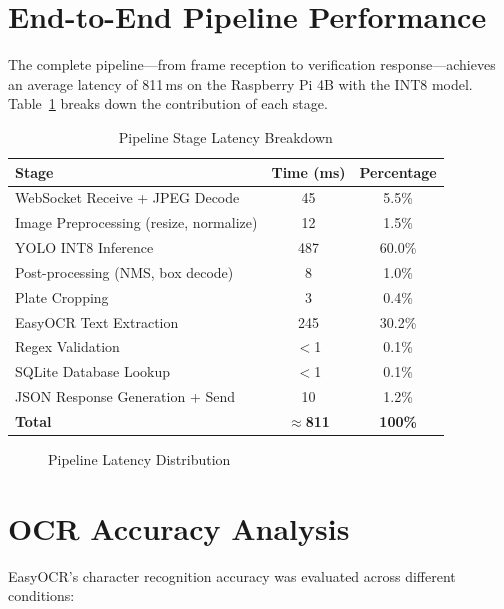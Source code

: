 \documentclass[11pt]{report}
\begin{document}
\section{End-to-End Pipeline Performance}
The complete pipeline---from frame reception to verification response---achieves an average latency of 811\,ms on the Raspberry Pi 4B with the INT8 model. Table~\ref{tab:pipeline_breakdown} breaks down the contribution of each stage.

\begin{table}[H]
\centering
\caption{Pipeline Stage Latency Breakdown}
\label{tab:pipeline_breakdown}
\renewcommand{\arraystretch}{1.3}
\begin{tabular}{|l|c|c|}
\hline
\textbf{Stage} & \textbf{Time (ms)} & \textbf{Percentage} \\
\hline
WebSocket Receive + JPEG Decode & 45 & 5.5\% \\
\hline
Image Preprocessing (resize, normalize) & 12 & 1.5\% \\
\hline
YOLO INT8 Inference & 487 & 60.0\% \\
\hline
Post-processing (NMS, box decode) & 8 & 1.0\% \\
\hline
Plate Cropping & 3 & 0.4\% \\
\hline
EasyOCR Text Extraction & 245 & 30.2\% \\
\hline
Regex Validation & $<$1 & 0.1\% \\
\hline
SQLite Database Lookup & $<$1 & 0.1\% \\
\hline
JSON Response Generation + Send & 10 & 1.2\% \\
\hline
\textbf{Total} & \textbf{$\approx$811} & \textbf{100\%} \\
\hline
\end{tabular}
\end{table}

\begin{figure}[H]
\centering
{}
\caption{Pipeline Latency Distribution}
\label{fig:pie_latency}
\end{figure}

\section{OCR Accuracy Analysis}
EasyOCR's character recognition accuracy was evaluated across different conditions:
\end{document}
